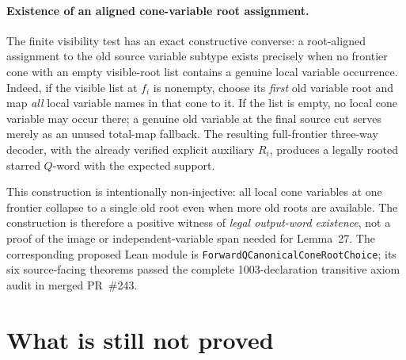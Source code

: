 \documentclass[11pt]{article}
\begin{document}
\paragraph{Existence of an aligned cone-variable root assignment.}
The finite visibility test has an exact constructive
converse: a root-aligned assignment to the old source
variable subtype exists precisely when no frontier
cone with an empty visible-root list contains a genuine
local variable occurrence. Indeed, if the visible list
at \(f_i\) is nonempty, choose its \emph{first}
old variable root and map \emph{all} local variable
names in that cone to it. If the list is empty,
no local cone variable may occur there; a genuine
old variable at the final source cut serves merely
as an unused total-map fallback. The resulting
full-frontier three-way decoder, with the already
verified explicit auxiliary \(R_i\), produces a
legally rooted starred \(Q\)-word with the
expected support.

This construction is intentionally non-injective:
all local cone variables at one frontier collapse
to a single old root even when more old roots
are available. The construction is therefore a
positive witness of \emph{legal output-word existence},
not a proof of the image or independent-variable
span needed for Lemma~27. The corresponding proposed
Lean module is
\texttt{ForwardQCanonicalConeRootChoice}; its six
source-facing theorems passed the complete
1003-declaration transitive axiom audit
in merged PR~\#243.

\section*{What is still not proved}
\end{document}
